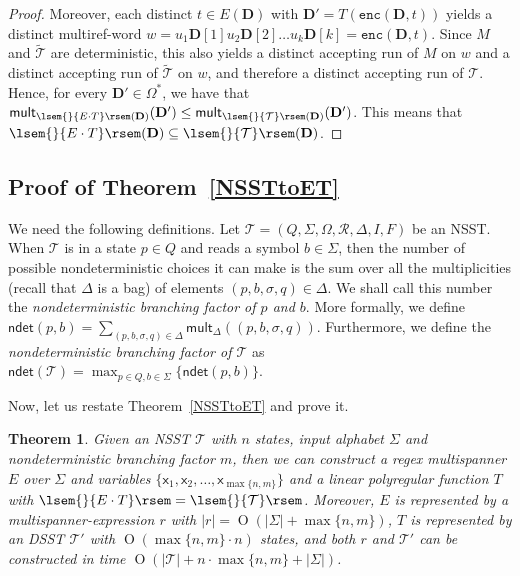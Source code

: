 \documentclass[
a4paper
]{article}
\theoremstyle{plain}
\newtheorem{theorem}{Theorem}[section]
\theoremstyle{definition}
\theoremstyle{remark}
\newcommand{\doc}{\ensuremath{\mathbf{D}}}
\newcommand{\varsx}{\ensuremath{\textsf{x}}}
\newcommand{\nrefw}[1]{\ensuremath{\mathtt{enc}(#1)}}
\newcommand{\mult}[2]{\operatorname{mult}_{#1}(#2)}
\newcommand{\Reg}{\mathcal{R}}
\newcommand{\ndetbf}[1]{\textsf{ndet}(#1)}
\newcommand{\nsst}{\mathcal{T}}
\newcommand{\sst}{\mathcal{T}}
\newcommand{\sem}[1]{{\lsem{}{#1}\rsem}}
\renewcommand{\operatorname}[1]{\textsf{#1}}
\DeclareMathOperator{\bigo}{O}
\begin{document}
\begin{proof}
Moreover, each distinct $t \in E(\doc)$ with $\doc' = T(\nrefw{\doc, t})$ yields a distinct multiref-word $w = u_1 \doc[1] u_2 \doc[2] \ldots u_k \doc[k] = \nrefw{\doc, t}$. Since $M$ and $\widetilde{\sst}$ are deterministic, this also yields a distinct accepting run of $M$ on $w$ and a distinct accepting run of $\widetilde{\sst}$ on $w$, and therefore a distinct accepting run of $\sst$. Hence, for every $\doc' \in \Omega^*$, we have that $\mult{\sem{E \cdot T}(\doc)}{\doc'} \leq \mult{\sem{\sst}(\doc)}{\doc'}$. This means that $\sem{E \cdot T}(\doc) \subseteq \sem{\sst}(\doc)$.

\end{proof}


\subsection{Proof of Theorem~\ref{NSSTtoET}}

We need the following definitions. Let $\nsst = (Q, \Sigma, \Omega,  \Reg, \Delta, I, F)$ be an NSST. When $\nsst$ is in a state $p \in Q$ and reads a symbol $b \in \Sigma$, then the number of possible nondeterministic choices it can make is the sum over all the multiplicities (recall that $\Delta$ is a bag) of elements $(p, b, \sigma, q) \in \Delta$. We shall call this number the \emph{nondeterministic branching factor of $p$ and $b$}. More formally, we define $\ndetbf{p, b} = \sum_{(p, b, \sigma, q) \in \Delta} \mult{\Delta}{(p, b, \sigma, q)}$. Furthermore, we define the \emph{nondeterministic branching factor of $\nsst$} as $\ndetbf{\nsst} = \max_{p \in Q, b \in \Sigma}\{\ndetbf{p, b}\}$.

Now, let us restate Theorem~\ref{NSSTtoET} and prove it.

\begin{theorem}
Given an NSST $\sst$ with $n$ states, input alphabet $\Sigma$ and nondeterministic branching factor $m$, then we can construct a regex multispanner $E$ over $\Sigma$ and variables $\{\varsx_1, \varsx_2, \ldots, \varsx_{\max\{n, m\}}\}$ and a linear polyregular function $T$ with $\sem{E \cdot T} = \sem{\sst}$. Moreover, $E$ is represented by a multispanner-expression $r$ with $|r| = \bigo(|\Sigma| + \max\{n, m\})$, $T$ is represented by an DSST $\sst'$ with $\bigo(\max\{n, m\} \cdot n)$ states, and both $r$ and $\sst'$ can be constructed in time $\bigo(|\sst| + n \cdot \max\{n, m\} + |\Sigma|)$.
\end{theorem}
\end{document}
